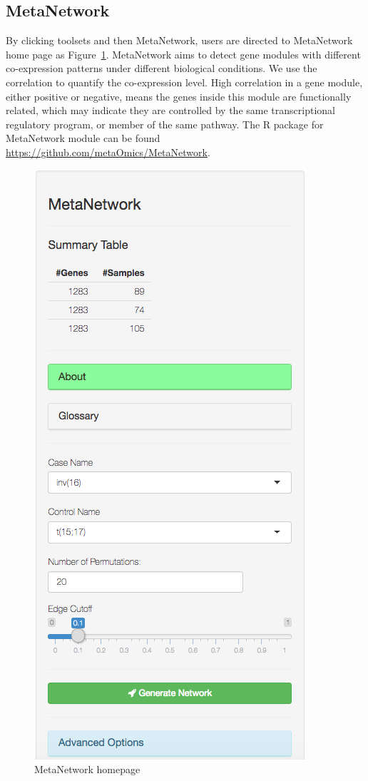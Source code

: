 \subsection{MetaNetwork}
By clicking toolsets and then MetaNetwork,
users are directed to MetaNetwork home page as Figure~\ref{fig:MetaNetworkHome}.
MetaNetwork aims to detect gene modules with different co-expression patterns under different biological conditions. 
We use the correlation to quantify the co-expression level. 
High correlation in a gene module, either positive or negative, means the genes inside this module are functionally related, 
which may indicate they are controlled by the same transcriptional regulatory program, or member of the same pathway.
The R package for MetaNetwork module can be found \url{https://github.com/metaOmics/MetaNetwork}.

\begin{figure}[H]
\begin{center}
\includegraphics[scale=0.5]{./figure/MetaNetwork/MetaNetworkHome}
\caption{MetaNetwork homepage}
\label{fig:MetaNetworkHome}
\end{center}
\end{figure}

